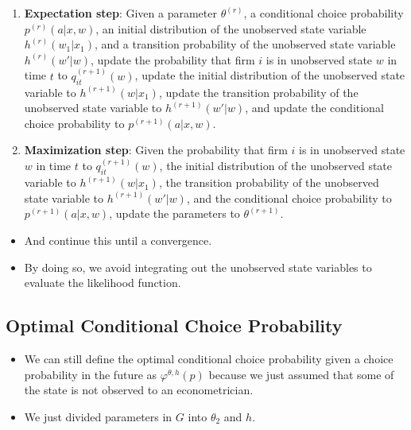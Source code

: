 \documentclass[]{book}
\providecommand{\tightlist}{%
  \setlength{\itemsep}{0pt}\setlength{\parskip}{0pt}}
\begin{document}
\begin{enumerate}
\def\labelenumi{\arabic{enumi}.}
\tightlist
\item
  \textbf{Expectation step}: Given a parameter \(\theta^{(r)}\), a
  conditional choice probability \(p^{(r)}(a|x, w)\), an initial
  distribution of the unobserved state variable \(h^{(r)}(w_1|x_1)\),
  and a transition probability of the unobserved state variable
  \(h^{(r)}(w'|w)\), update the probability that firm \(i\) is in
  unobserved state \(w\) in time \(t\) to \(q_{it}^{(r + 1)}(w)\),
  update the initial distribution of the unobserved state variable to
  \(h^{(r + 1)}(w|x_1)\), update the transition probability of the
  unobserved state variable to \(h^{(r + 1)}(w'|w)\), and update the
  conditional choice probability to \(p^{(r + 1)}(a|x, w)\).
\item
  \textbf{Maximization step}: Given the probability that firm \(i\) is
  in unobserved state \(w\) in time \(t\) to \(q_{it}^{(r + 1)}(w)\),
  the initial distribution of the unobserved state variable to
  \(h^{(r + 1)}(w|x_1)\), the transition probability of the unobserved
  state variable to \(h^{(r + 1)}(w'|w)\), and the conditional choice
  probability to \(p^{(r + 1)}(a|x, w)\), update the parameters to
  \(\theta^{(r + 1)}\).
\end{enumerate}

\begin{itemize}
\tightlist
\item
  And continue this until a convergence.
\item
  By doing so, we avoid integrating out the unobserved state variables
  to evaluate the likelihood function.
\end{itemize}

\subsection{Optimal Conditional Choice
Probability}\label{optimal-conditional-choice-probability-1}

\begin{itemize}
\tightlist
\item
  We can still define the optimal conditional choice probability given a
  choice probability in the future as \(\varphi^{\theta, h}(p)\) because
  we just assumed that some of the state is not observed to an
  econometrician.
\item
  We just divided parameters in \(G\) into \(\theta_2\) and \(h\).
\end{itemize}
\end{document}
